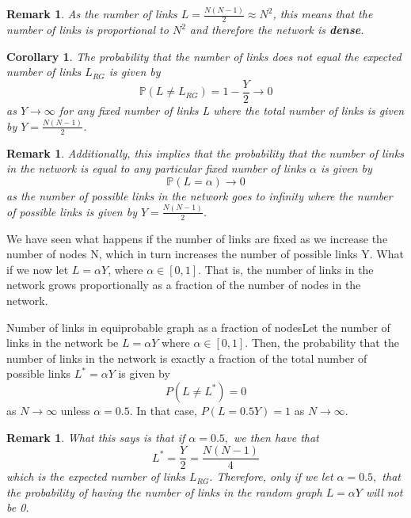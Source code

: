 \documentclass[twoside]{article}
\newcommand{\prob}{\mathbb{P}}
\newtheorem{corollary}[theorem]{Corollary}
\newtheorem{remark}[theorem]{Remark}
\begin{document}
\begin{remark}As the number of links $L = \frac{N(N - 1)}{2} \approx N^2$, this means that the number of links is proportional to $N^2$ and therefore the network is \textbf{dense}.
\end{remark}

\begin{corollary}The probability that the number of links does not equal the expected number of links $L_{RG}$ is given by 
$$
\prob(L \neq L_{RG}) = 1 - \frac{Y}{2} \rightarrow 0
$$
as $Y \rightarrow \infty$ for any fixed number of links L where the total number of links is given by $Y = \frac{N(N-1)}{2}$.
\end{corollary}

\begin{remark} Additionally, this implies that the probability that the number of links in the network is equal to any particular fixed number of links $\alpha$ is given by 
$$
\prob(L = \alpha) \rightarrow 0
$$
as the number of possible links in the network goes to infinity where the number of possible links is given by $Y = \frac{N(N-1)}{2}$.
\end{remark}

We have seen what happens if the number of links are fixed as we increase the number of nodes N, which in turn increases the number of possible links Y. What if we now let $L = \alpha Y$, where $\alpha \in [0,1]$. That is, the number of links in the network grows proportionally as a fraction of the number of nodes in the network.

\begin{theorem_exam}{Number of links in equiprobable graph as a fraction of nodes}{}Let the number of links in the network be $L = \alpha Y$ where $\alpha \in [0,1].$ Then, the probability that the number of links in the network is exactly a fraction of the total number of possible links $L^* = \alpha Y$ is given by
$$
P(L \neq L^*) = 0
$$
as $N \rightarrow \infty$ unless $\alpha = 0.5$. In that case, $P(L = 0.5Y) = 1$ as $N \rightarrow \infty.$
\end{theorem_exam}

\begin{remark} What this says is that if $\alpha = 0.5,$ we then have that 
$$
L^* = \frac{Y}{2} = \frac{N(N-1)}{4}
$$
which is the expected number of links $L_{RG}.$ Therefore, only if we let $\alpha = 0.5,$ that the probability of having the number of links in the random graph $L = \alpha Y$ will not be 0.
\end{remark}
\end{document}
